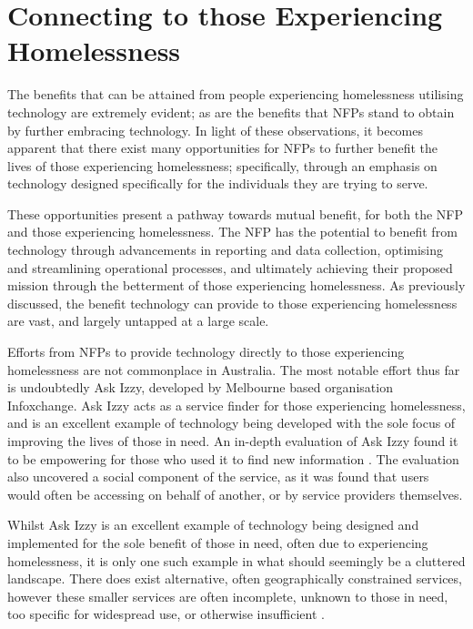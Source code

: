 \section{Connecting to those Experiencing Homelessness}

The benefits that can be attained from people experiencing homelessness utilising technology are extremely evident; as are the benefits that NFPs stand to obtain by further embracing technology. In light of these observations, it becomes apparent that there exist many opportunities for NFPs to further benefit the lives of those experiencing homelessness; specifically, through an emphasis on technology designed specifically for the individuals they are trying to serve.

These opportunities present a pathway towards mutual benefit, for both the NFP and those experiencing homelessness. The NFP has the potential to benefit from technology through advancements in reporting and data collection, optimising and streamlining operational processes, and ultimately achieving their proposed mission through the betterment of those experiencing homelessness. As previously discussed, the benefit technology can provide to those experiencing homelessness are vast, and largely untapped at a large scale.

Efforts from NFPs to provide technology directly to those experiencing homelessness are not commonplace in Australia. The most notable effort thus far is undoubtedly Ask Izzy, developed by Melbourne based organisation Infoxchange. Ask Izzy acts as a service finder for those experiencing homelessness, and is an excellent example of technology being developed with the sole focus of improving the lives of those in need. An in-depth evaluation of Ask Izzy found it to be empowering for those who used it to find new information \cite{burrows2019evaluating}. The evaluation also uncovered a social component of the service, as it was found that users would often be accessing on behalf of another, or by service providers themselves.

Whilst Ask Izzy is an excellent example of technology being designed and implemented for the sole benefit of those in need, often due to experiencing homelessness, it is only one such example in what should seemingly be a cluttered landscape. There does exist alternative, often geographically constrained services, however these smaller services are often incomplete, unknown to those in need, too specific for widespread use, or otherwise insufficient \cite{gough2013improving} \cite{gough2016designing}.

